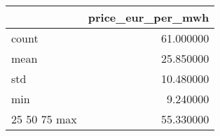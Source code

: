 \begin{tabular}{lr}
\toprule
 & price_eur_per_mwh \\
\midrule
count & 61.000000 \\
mean & 25.850000 \\
std & 10.480000 \\
min & 9.240000 \\
25%
50%
75%
max & 55.330000 \\
\bottomrule
\end{tabular}
